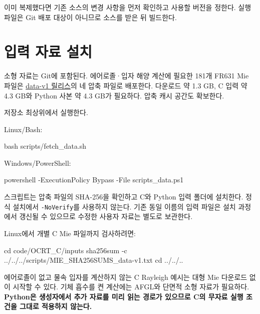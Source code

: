 이미 복제했다면 기존 소스의 변경 사항을 먼저 확인하고 사용할 버전을 정한다. 실행 파일은 Git 배포 대상이 아니므로 소스를 받은 뒤 빌드한다.

\section{입력 자료 설치}
\label{sec:auto:02_installation:2}
소형 자료는 Git에 포함된다. 에어로졸·입자 해양 계산에 필요한 181개 FR631 Mie 파일은 \href{https://github.com/brtnt/OCRT/releases/tag/data-v1}{data-v1 릴리스}의 네 압축 파일로 배포한다. 다운로드 약 1.3 GB, C 입력 약 4.3 GB와 Python 사본 약 4.3 GB가 필요하다. 압축 캐시 공간도 확보한다.

저장소 최상위에서 실행한다.

Linux/Bash:


\par\noindent\begin{minipage}{\linewidth}
\begin{ManualCode}
bash scripts/fetch_data.sh
\end{ManualCode}
\end{minipage}\par

Windows/PowerShell:


\par\noindent\begin{minipage}{\linewidth}
\begin{ManualCode}
powershell -ExecutionPolicy Bypass -File scripts\fetch_data.ps1
\end{ManualCode}
\end{minipage}\par

스크립트는 압축 파일의 SHA-256을 확인하고 C와 Python 입력 폴더에 설치한다. 정식 설치에서 \texttt{-\allowbreak{}NoVerify}를 사용하지 않는다. 기존 동일 이름의 입력 파일은 설치 과정에서 갱신될 수 있으므로 수정한 사용자 자료는 별도로 보관한다.

Linux에서 개별 C Mie 파일까지 검사하려면:


\par\noindent\begin{minipage}{\linewidth}
\begin{ManualCode}
cd code/OCRT_C/inputs
sha256sum -c ../../../scripts/MIE_SHA256SUMS_data-v1.txt
cd ../../..
\end{ManualCode}
\end{minipage}\par

에어로졸이 없고 물속 입자를 계산하지 않는 C Rayleigh 예시는 대형 Mie 다운로드 없이 시작할 수 있다. 기체 흡수를 켠 계산에는 AFGL와 단면적 소형 자료가 필요하다. \textbf{Python은 생성자에서 추가 자료를 미리 읽는 경로가 있으므로 C의 무자료 실행 조건을 그대로 적용하지 않는다.}

